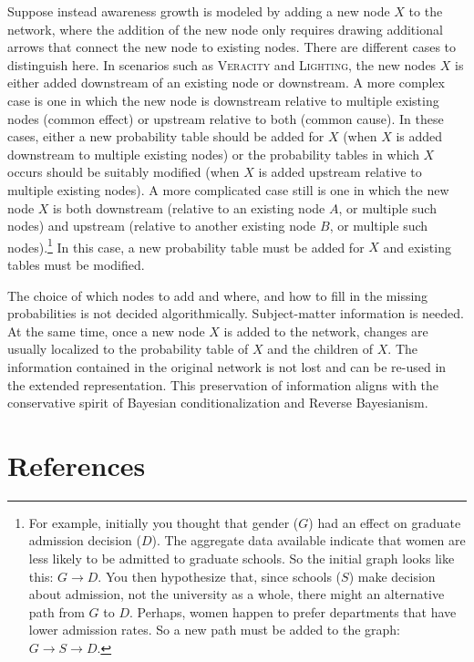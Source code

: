 \documentclass[
  11pt,
  dvipsnames,enabledeprecatedfontcommands, todos]{scrartcl}
\begin{document}
Suppose instead awareness growth is modeled by adding a new node \(X\)
to the network, where the addition of the new node only requires drawing
additional arrows that connect the new node to existing nodes. There are
different cases to distinguish here. In scenarios such as
\textsc{Veracity} and \textsc{Lighting}, the new nodes \(X\) is either
added downstream of an existing node or downstream. A more complex case
is one in which the new node is downstream relative to multiple existing
nodes (common effect) or upstream relative to both (common cause). In
these cases, either a new probability table should be added for \(X\)
(when \(X\) is added downstream to multiple existing nodes) or the
probability tables in which \(X\) occurs should be suitably modified
(when \(X\) is added upstream relative to multiple existing nodes). A
more complicated case still is one in which the new node \(X\) is both
downstream (relative to an existing node \(A\), or multiple such nodes)
and upstream (relative to another existing node \(B\), or multiple such
nodes).\footnote{For example, initially you thought that gender (\(G\))
  had an effect on graduate admission decision (\(D\)). The aggregate
  data available indicate that women are less likely to be admitted to
  graduate schools. So the initial graph looks like this:
  \(G \rightarrow D\). You then hypothesize that, since schools (\(S\))
  make decision about admission, not the university as a whole, there
  might an alternative path from \(G\) to \(D\). Perhaps, women happen
  to prefer departments that have lower admission rates. So a new path
  must be added to the graph: \(G \rightarrow S \rightarrow D\).} In
this case, a new probability table must be added for \(X\) and existing
tables must be modified.

The choice of which nodes to add and where, and how to fill in the
missing probabilities is not decided algorithmically. Subject-matter
information is needed. At the same time, once a new node \(X\) is added
to the network, changes are usually localized to the probability table
of \(X\) and the children of \(X\). The information contained in the
original network is not lost and can be re-used in the extended
representation. This preservation of information aligns with the
conservative spirit of Bayesian conditionalization and Reverse
Bayesianism.

\singlespace

\hypertarget{references}{%
\section*{References}\label{references}}
\end{document}
